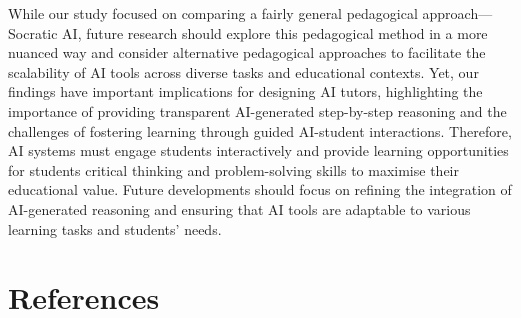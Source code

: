 \documentclass[
  12pt,
]{article}
\begin{document}
While our study focused on comparing a fairly general pedagogical approach---Socratic AI, future research should explore this pedagogical method in a more nuanced way and consider alternative pedagogical approaches to facilitate the scalability of AI tools across diverse tasks and educational contexts. Yet, our findings have important implications for designing AI tutors, highlighting the importance of providing transparent AI-generated step-by-step reasoning and the challenges of fostering learning through guided AI-student interactions. Therefore, AI systems must engage students interactively and provide learning opportunities for students critical thinking and problem-solving skills to maximise their educational value. Future developments should focus on refining the integration of AI-generated reasoning and ensuring that AI tools are adaptable to various learning tasks and students' needs.

\section*{References}\label{references}
\end{document}

